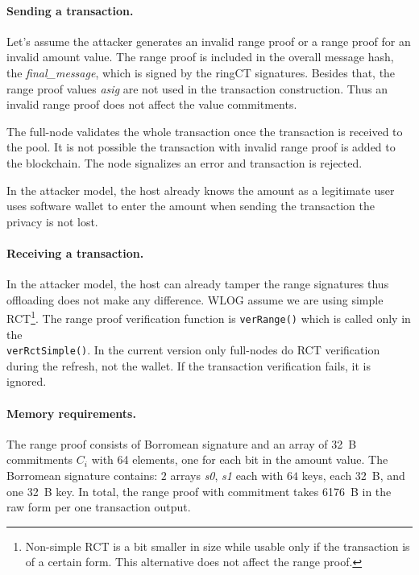 \documentclass[]{article}
\begin{document}
\paragraph{Sending a transaction.}
Let's assume the attacker generates an invalid range proof or a range proof for an invalid amount value. The range proof is included in the overall message hash, the \emph{final\_message}, which is signed by the ringCT signatures. Besides that, the range proof values \emph{asig} are not used in the transaction construction. Thus an invalid range proof does not affect the value commitments. 

The full-node validates the whole transaction once the transaction is received to the pool. It is not possible the transaction with invalid range proof is added to the blockchain. The node signalizes an error and transaction is rejected.

In the attacker model, the host already knows the amount as a legitimate user uses software wallet to enter the amount when sending the transaction the privacy is not lost.

\paragraph{Receiving a transaction.}
In the attacker model, the host can already tamper the range signatures thus offloading does not make any difference.
WLOG assume we are using simple RCT\footnote{Non-simple RCT is a bit smaller in size while usable only if the transaction is of a certain form. This alternative does not affect the range proof.}. The range proof verification function is \verb|verRange()| which is called only in the \\\verb|verRctSimple()|. In the current version only full-nodes do RCT verification during the refresh, not the wallet. If the transaction verification fails, it is ignored.

\paragraph{Memory requirements.} 
The range proof consists of Borromean signature and an array of 32~B commitments $C_i$ with 64 elements, one for each bit in the amount value. The Borromean signature contains: $2$ arrays \emph{s0}, \emph{s1} each with $64$ keys, each 32~B, and one 32~B key. In total, the range proof with commitment takes 6176~B in the raw form per one transaction output.
\end{document}
